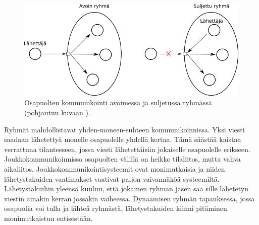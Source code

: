 \begin{figure}[ht!]
	\includegraphics[width=1\textwidth]{pictures/group-communication.png}
	\caption{Osapuolten kommunikointi avoimessa ja suljetussa ryhmässä (pohjautuu kuvaan \mbox{\cite[s.~235]{distributed-systems-concepts-and-design}}).}
	\label{fig:group-communication}
\end{figure}

Ryhmät mahdollistavat yhden-moneen-suhteen kommunikoinnissa. Yksi viesti saadaan lähetettyä monelle osapuolelle yhdellä kertaa. Tämä säästää kaistaa verrattuna tilanteeseen, jossa viesti lähetettäisiin jokaiselle osapuolelle erikseen. Joukkokommunikoinnissa osapuolten välillä on heikko tilaliitos, mutta vahva aikaliitos. Joukkokommunikointisysteemit ovat monimutkaisia ja niiden lähetystakuiden vaatimukset vaativat paljon vaivannäköä systeemiltä. Lähetystakuihin yleensä kuuluu, että jokainen ryhmän jäsen saa sille lähetetyn viestin ainakin kerran jossakin vaiheessa. Dynaamisen ryhmän tapauksessa, jossa osapuolia voi tulla ja lähteä ryhmästä, lähetystakuiden kiinni pitäminen monimutkaistuu entisestään. \mbox{\cite{group-communication-specification}} \mbox{\cite[s.~236]{distributed-systems-concepts-and-design}}


